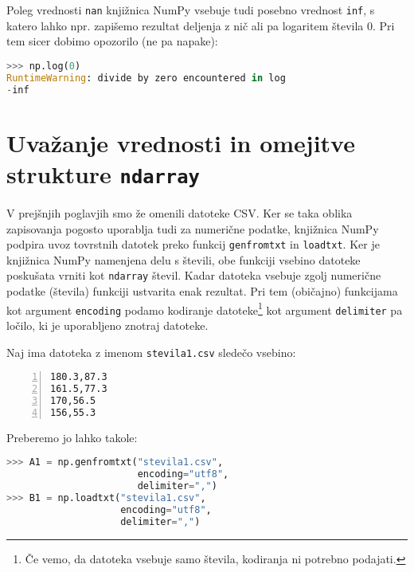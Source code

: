 Poleg vrednosti \texttt{nan} knjižnica NumPy vsebuje tudi posebno vrednost \texttt{inf}, s katero lahko npr. zapišemo rezultat deljenja z nič ali pa logaritem števila 0. Pri tem sicer dobimo opozorilo (ne pa napake):
\begin{lstlisting}[language=Python]
>>> np.log(0)
RuntimeWarning: divide by zero encountered in log
-inf
\end{lstlisting}

\section{Uvažanje vrednosti in omejitve strukture \texttt{ndarray}}

V prejšnjih poglavjih smo že omenili datoteke CSV. Ker se taka oblika zapisovanja pogosto uporablja tudi za numerične podatke, knjižnica NumPy podpira uvoz tovrstnih datotek preko funkcij \texttt{genfromtxt} in \texttt{loadtxt}. Ker je knjižnica NumPy namenjena delu s števili, obe funkciji vsebino datoteke poskušata vrniti kot \texttt{ndarray} števil. Kadar datoteka vsebuje zgolj numerične podatke (števila) funkciji ustvarita enak rezultat.  Pri tem (običajno) funkcijama kot argument \texttt{encoding} podamo kodiranje datoteke\footnote{Če vemo, da datoteka vsebuje samo števila, kodiranja ni potrebno podajati.} kot argument \texttt{delimiter} pa ločilo, ki je uporabljeno znotraj datoteke.

Naj ima datoteka z imenom \texttt{stevila1.csv} sledečo vsebino:
\begin{lstlisting}[numbers=left]
180.3,87.3
161.5,77.3
170,56.5
156,55.3
\end{lstlisting}
Preberemo jo lahko takole:
\begin{lstlisting}[language=Python]
>>> A1 = np.genfromtxt("stevila1.csv",
                       encoding="utf8",
                       delimiter=",")
>>> B1 = np.loadtxt("stevila1.csv", 
                    encoding="utf8", 
                    delimiter=",")
\end{lstlisting}

